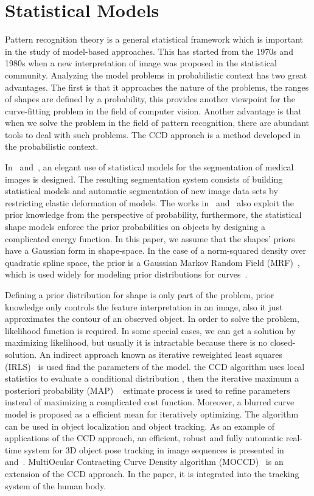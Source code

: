 \documentclass[conference]{IEEEtran}
\begin{document}
\section{Statistical Models}
\label{sec:sm}
Pattern recognition theory is a general statistical framework which is
important in the study of model-based approaches. This has started from the 1970s
and 1980s when a new interpretation of image was proposed in the
statistical community.  Analyzing the model problems in probabilistic
context has two great advantages. The first is that it approaches the
nature of the problems, the ranges of shapes are defined by a
probability, this provides another viewpoint for the curve-fitting problem
in the field of computer vision. Another advantage is that when we
solve the problem in the field of pattern recognition, there are abundant tools to deal with such problems. 
The CCD approach is a method developed in the probabilistic context. 

In~\cite{kelemen1999three} and~\cite{kelemen1999elastic}, an elegant
use of statistical models for the segmentation of medical images is
designed.  The resulting segmentation system consists of building
statistical models and automatic segmentation of new image data
sets by restricting elastic deformation of models.  The works
in~\cite{sclaroff2001deformable} and~\cite{liu1999deformable} also
exploit the prior knowledge from the perspective of probability,
furthermore, the statistical shape models enforce the prior
probabilities on objects by designing a complicated energy function.  
In this paper, we assume that the shapes' priors have a Gaussian form in
shape-space. In the case of a norm-squared density over  quadratic spline space,
the prior is a Gaussian Markov Random Field
(MRF)~\cite{blake1998active}, which is used widely  for modeling
prior distributions for curves~\cite{storvik1994bayesian}.

Defining a prior distribution for shape is only part of the
problem, prior knowledge only controls the feature interpretation in an
image, also it just approximates the contour of an observed object. In
order to solve the problem, likelihood function is required. In some
special cases, we can get a solution by maximizing likelihood, but
usually it is intractable because there is no closed-solution. An indirect
approach known as iterative reweighted least squares
(IRLS)~\cite{bishop2006pattern} is used find the parameters of the model.
the CCD  algorithm uses local statistics to evaluate a conditional distribution
, then the iterative maximum a posteriori probability (MAP)
~\cite{sorenson1980parameter} estimate process is used to refine
parameters instead of maximizing a complicated cost function. 
Moreover, a blurred curve model is proposed as a efficient mean for iteratively optimizing. The algorithm
can be used in object localization and object tracking. As an example
of applications of the CCD approach, an efficient, robust and fully
automatic real-time system for 3D object pose tracking in
image sequences is presented in~\cite{panin2006fully}
and~\cite{panin2006efficient}. MultiOcular Contracting Curve Density
algorithm (MOCCD)~\cite{hahn2007tracking} is an extension of the CCD
approach. In the paper, it is integrated into the tracking system of
the human body. 
\end{document}
